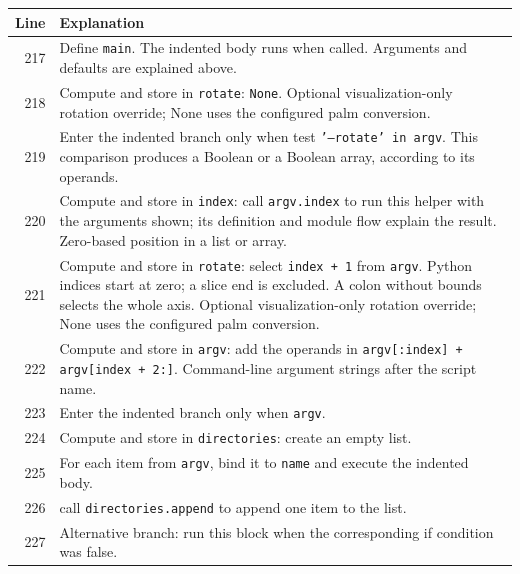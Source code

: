 \documentclass[11pt,a4paper]{book}
\begin{document}
\begin{longtable}{r p{}}

\textbf{Line} & \textbf{Explanation} \\ \hline \endhead

217 & Define \texttt{main}. The indented body runs when called. Arguments and defaults are explained above. \\

218 & Compute and store in \texttt{rotate}: \texttt{None}. Optional visualization-only rotation override; None uses the configured palm conversion. \\

219 & Enter the indented branch only when test \texttt{'--rotate' in argv}. This comparison produces a Boolean or a Boolean array, according to its operands. \\

220 & Compute and store in \texttt{index}: call \texttt{argv.index} to run this helper with the arguments shown; its definition and module flow explain the result. Zero-based position in a list or array. \\

221 & Compute and store in \texttt{rotate}: select \texttt{index + 1} from \texttt{argv}. Python indices start at zero; a slice end is excluded. A colon without bounds selects the whole axis. Optional visualization-only rotation override; None uses the configured palm conversion. \\

222 & Compute and store in \texttt{argv}: add the operands in \texttt{argv[:index] + argv[index + 2:]}. Command-line argument strings after the script name. \\

223 & Enter the indented branch only when \texttt{argv}. \\

224 & Compute and store in \texttt{directories}: create an empty list.  \\

225 & For each item from \texttt{argv}, bind it to \texttt{name} and execute the indented body. \\

226 & call \texttt{directories.append} to append one item to the list. \\

227 & Alternative branch: run this block when the corresponding if condition was false. \\


\end{longtable}
\end{document}
